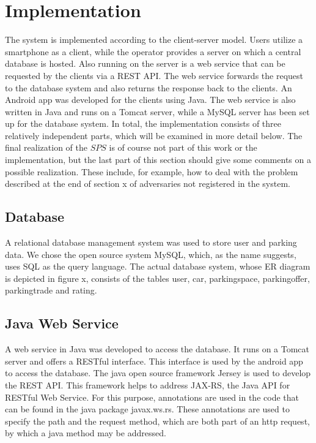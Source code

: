 \documentclass[
a4paper,     %
titlepage,   %
14pt         %
]{scrartcl}  %
\theoremstyle{mystyle}
\begin{document}
\section{Implementation}
The system is implemented according to the client-server model. Users utilize a smartphone as a client, while the operator provides a server on which a central database is hosted. Also running on the server is a web service that can be requested by the clients via a REST API. The web service forwards the request to the database system and also returns the response back to the clients. An Android app was developed for the clients using Java. The web service is also written in Java and runs on a Tomcat server, while a MySQL server has been set up for the database system. In total, the implementation consists of three relatively independent parts, which will be examined in more detail below. The final realization of the $SPS$ is of course not part of this work or the implementation, but the last part of this section should give some comments on a possible realization. These include, for example, how to deal with the problem described at the end of section x of adversaries not registered in the system.

\subsection{Database}
A relational database management system was used to store user and parking data. We chose the open source system MySQL, which, as the name suggests, uses SQL as the query language. The actual database system, whose ER diagram is depicted in figure x, consists of the tables user, car, parkingspace, parkingoffer, parkingtrade and rating.

\subsection{Java Web Service}
A web service in Java was developed to access the database. It runs on a Tomcat server and offers a RESTful interface. This interface is used by the android app to access the database. The java open source framework Jersey is used to develop the REST API. This framework helps to address JAX-RS, the Java API for RESTful Web Service. For this purpose, annotations are used in the code that can be found in the java package javax.ws.rs. These annotations are used to specify the path and the request method, which are both part of an http request, by which a java method may be addressed.
\end{document}
